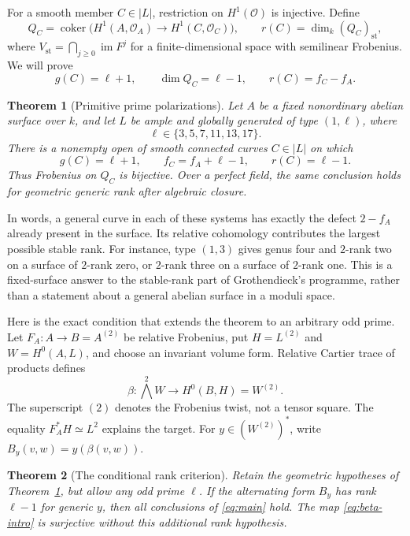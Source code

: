 \documentclass[11pt]{article}
\newtheorem{theorem}{Theorem}[section]
\theoremstyle{definition}\newtheorem{definition}[theorem]{Definition}
\theoremstyle{remark}\newtheorem{remark}[theorem]{Remark}
\newcommand{\OO}{\mathcal O}
\newcommand{\st}{\mathrm{st}}
\begin{document}
For a smooth member $C\in|L|$, restriction on $H^1(\OO)$ is injective. Define
\[
 Q_C=\operatorname{coker}\bigl(H^1(A,\OO_A)\longrightarrow
 H^1(C,\OO_C)\bigr),\qquad
 r(C)=\dim_k(Q_C)_{\st},
\]
where $V_{\st}=\bigcap_{j\ge0}\operatorname{im}F^j$ for a finite-dimensional space with semilinear Frobenius. We will prove
\begin{equation}\label{eq:dimensions}
 g(C)=\ell+1,\qquad \dim Q_C=\ell-1,\qquad r(C)=f_C-f_A.
\end{equation}

\begin{theorem}[Primitive prime polarizations]\label{thm:main}
Let $A$ be a fixed nonordinary abelian surface over $k$, and let $L$ be ample and globally generated of type $(1,\ell)$, where
\[
 \ell\in\{3,5,7,11,13,17\}.
\]
There is a nonempty open of smooth connected curves $C\in|L|$ on which
\begin{equation}\label{eq:main}
 g(C)=\ell+1,\qquad f_C=f_A+\ell-1,\qquad r(C)=\ell-1.
\end{equation}
Thus Frobenius on $Q_C$ is bijective. Over a perfect field, the same conclusion holds for geometric generic rank after algebraic closure.
\end{theorem}

In words, a general curve in each of these systems has exactly the defect $2-f_A$ already present in the surface. Its relative cohomology contributes the largest possible stable rank. For instance, type $(1,3)$ gives genus four and $2$-rank two on a surface of $2$-rank zero, or $2$-rank three on a surface of $2$-rank one. This is a fixed-surface answer to the stable-rank part of Grothendieck's programme, rather than a statement about a general abelian surface in a moduli space.

Here is the exact condition that extends the theorem to an arbitrary odd prime. Let $F_A:A\to B=A^{(2)}$ be relative Frobenius, put $H=L^{(2)}$ and $W=H^0(A,L)$, and choose an invariant volume form. Relative Cartier trace of products defines
\begin{equation}\label{eq:beta-intro}
 \beta:\bigwedge^2W\longrightarrow H^0(B,H)=W^{(2)}.
\end{equation}
The superscript $(2)$ denotes the Frobenius twist, not a tensor square. The equality $F_A^*H\simeq L^2$ explains the target. For $y\in(W^{(2)})^*$, write $B_y(v,w)=y(\beta(v,w))$.

\begin{theorem}[The conditional rank criterion]\label{thm:conditional}
Retain the geometric hypotheses of Theorem~\ref{thm:main}, but allow any odd prime $\ell$. If the alternating form $B_y$ has rank $\ell-1$ for generic $y$, then all conclusions of \eqref{eq:main} hold. The map \eqref{eq:beta-intro} is surjective without this additional rank hypothesis.
\end{theorem}
\end{document}
